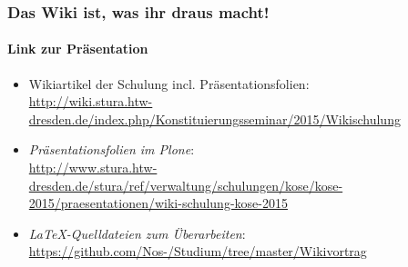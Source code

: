 \documentclass{beamer}
\begin{document}
\begin{frame}
  \frametitle{Das Wiki ist, was ihr draus macht!}
  \framesubtitle{Link zur Präsentation}

  \begin{itemize}
  \item Wikiartikel der Schulung incl. Präsentationsfolien:\\
   \url{http://wiki.stura.htw-dresden.de/index.php/Konstituierungsseminar/2015/Wikischulung}
  \item \emph{Präsentationsfolien im Plone}:\\
    \url{http://www.stura.htw-dresden.de/stura/ref/verwaltung/schulungen/kose/kose-2015/praesentationen/wiki-schulung-kose-2015}
  \item \emph{LaTeX-Quelldateien zum Überarbeiten}:\\
    \url{https://github.com/Nos-/Studium/tree/master/Wikivortrag}
  \end{itemize}
  
\end{frame}
\end{document}
